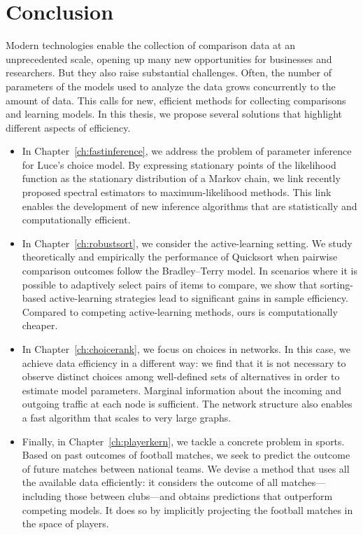 \chapter{Conclusion}
\label{ch:conclusion}

Modern technologies enable the collection of comparison data at an unprecedented scale, opening up many new opportunities for businesses and researchers.
But they also raise substantial challenges.
Often, the number of parameters of the models used to analyze the data grows concurrently to the amount of data.
This calls for new, efficient methods for collecting comparisons and learning models.
In this thesis, we propose several solutions that highlight different aspects of efficiency.

\begin{itemize}
\item In Chapter~\ref{ch:fastinference}, we address the problem of parameter inference for Luce's choice model.
By expressing stationary points of the likelihood function as the stationary distribution of a Markov chain, we link recently proposed spectral estimators to maximum-likelihood methods.
This link enables the development of new inference algorithms that are statistically and computationally efficient.

\item In Chapter~\ref{ch:robustsort}, we consider the active-learning setting.
We study theoretically and empirically the performance of Quicksort when pairwise comparison outcomes follow the Bradley--Terry model.
In scenarios where it is possible to adaptively select pairs of items to compare, we show that sorting-based active-learning strategies lead to significant gains in sample efficiency.
Compared to competing active-learning methods, ours is computationally cheaper.

\item In Chapter~\ref{ch:choicerank}, we focus on choices in networks.
In this case, we achieve data efficiency in a different way: we find that it is not necessary to observe distinct choices among well-defined sets of alternatives in order to estimate model parameters.
Marginal information about the incoming and outgoing traffic at each node is sufficient.
The network structure also enables a fast algorithm that scales to very large graphs.

\item Finally, in Chapter~\ref{ch:playerkern}, we tackle a concrete problem in sports.
Based on past outcomes of football matches, we seek to predict the outcome of future matches between national teams.
We devise a method that uses all the available data efficiently: it considers the outcome of all matches---including those between clubs---and obtains predictions that outperform competing models.
It does so by implicitly projecting the football matches in the space of players.
\end{itemize}

